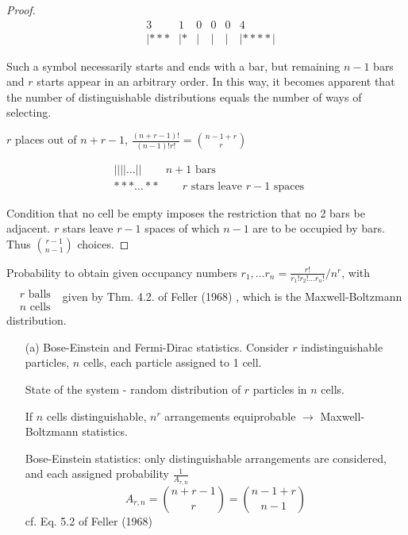 \documentclass[10pt]{amsart}
\begin{document}
\begin{multicols*}{2}
\begin{proof}
\[
\begin{aligned}
	& 3 	  & 1   & 0 & 0 & 0 & 4 \\
	& | * * * & | * & | & |   & | & | **** |  
\end{aligned}
\]

Such a symbol necessarily starts and ends with a bar, but remaining $n-1$ bars and $r$ starts appear in an arbitrary order.  In this way, it becomes apparent that the number of distinguishable distributions equals the number of ways of selecting.  

$r$ places out of $n+r-1$, $\frac{ (n+r-1)! }{ (n-1)! r!} = \binom{n-1+r}{r} $  

\[
\begin{aligned}
	& | | | | \dots | | \qquad \, n+1 \text{ bars } \\ 
	& * * * \dots * * \qquad \, r \text{ stars leave } r-1 \text{ spaces }
\end{aligned}
\]

Condition that no cell be empty imposes the restriction that no 2 bars be adjacent.  $r$ stars leave $r-1$ spaces of which $n-1$ are to be occupied by bars.  Thus $\binom{r-1}{n-1}$ choices.  


\end{proof}


Probability to obtain given occupancy numbers $r_1,\dots r_n = \frac{r!}{ r_1! r_2! \dots r_n! } / n^r$, with $ \begin{aligned} & \quad \\ 
	& r \text{ balls } \\ 
& n \text{ cells } \end{aligned}$  given by Thm. 4.2. of Feller (1968)  \cite{Fell1968}, which is the Maxwell-Boltzmann distribution.  

\begin{enumerate}
\item[(a)] Bose-Einstein and Fermi-Dirac statistics.  Consider $r$ indistinguishable particles, $n$ cells, each particle assigned to 1 cell.  

State of the system - random distribution of $r$ particles in $n$ cells.  

If $n$ cells distinguishable, $n^r$ arrangements equiprobable $\to $ Maxwell-Boltzmann statistics.  

Bose-Einstein statistics: only distinguishable arrangements are considered, and each assigned probability $\frac{1}{A_{r,n}}$  
\begin{equation}
A_{r,n} = \binom{n+r-1}{r} = \binom{n-1+r}{n-1}  
\end{equation}
cf. Eq. 5.2 of Feller (1968)  \cite{Fell1968}


\end{enumerate}
\end{multicols*}
\end{document}
